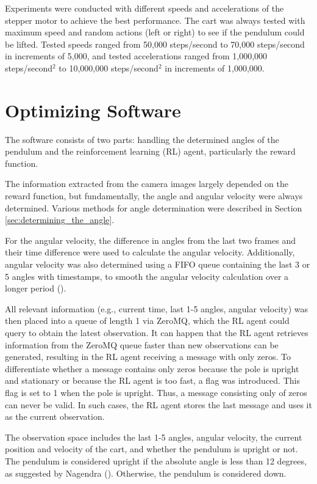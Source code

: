 Experiments were conducted with different speeds and accelerations of the stepper motor to achieve the best performance. The cart was always tested with maximum speed and random actions (left or right) to see if the pendulum could be lifted. Tested speeds ranged from 50,000 steps/second to 70,000 steps/second in increments of 5,000, and tested accelerations ranged from 1,000,000 steps/second$^2$ to 10,000,000 steps/second$^2$ in increments of 1,000,000.

\section{Optimizing Software}

The software consists of two parts: handling the determined angles of the pendulum and the reinforcement learning (RL) agent, particularly the reward function.

The information extracted from the camera images largely depended on the reward function, but fundamentally, the angle and angular velocity were always determined. Various methods for angle determination were described in Section \ref{sec:determining_the_angle}. 

For the angular velocity, the difference in angles from the last two frames and their time difference were used to calculate the angular velocity. Additionally, angular velocity was also determined using a FIFO queue containing the last 3 or 5 angles with timestamps, to smooth the angular velocity calculation over a longer period (\cite{nikhilaggarwal3_queue_2019}).

All relevant information (e.g., current time, last 1-5 angles, angular velocity) was then placed into a queue of length 1 via ZeroMQ, which the RL agent could query to obtain the latest observation. It can happen that the RL agent retrieves information from the ZeroMQ queue faster than new observations can be generated, resulting in the RL agent receiving a message with only zeros. To differentiate whether a message contains only zeros because the pole is upright and stationary or because the RL agent is too fast, a flag was introduced. This flag is set to 1 when the pole is upright. Thus, a message consisting only of zeros can never be valid. In such cases, the RL agent stores the last message and uses it as the current observation.

The observation space includes the last 1-5 angles, angular velocity, the current position and velocity of the cart, and whether the pendulum is upright or not. The pendulum is considered upright if the absolute angle is less than 12 degrees, as suggested by Nagendra (\citeyear{nagendra_comparison_2017}). Otherwise, the pendulum is considered down.

